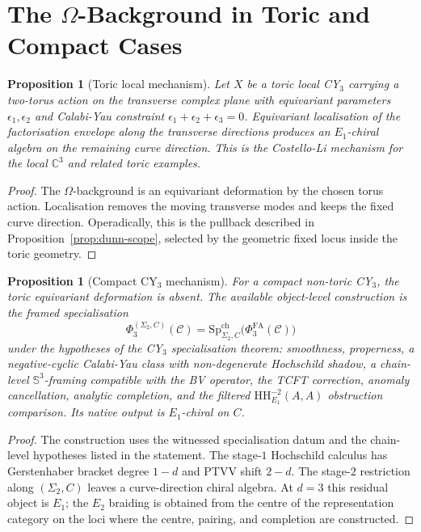 \documentclass[11pt]{amsart}
\newtheorem{proposition}[theorem]{Proposition}
\theoremstyle{definition}
\theoremstyle{remark}
\newcommand{\HH}{\mathrm{HH}}
\providecommand{\PhiFA}{\Phi^{\mathrm{FA}}}
\providecommand{\SpCh}{\mathrm{Sp}^{\mathrm{ch}}}
\newcommand{\cC}{\mathcal{C}}
\newcommand{\C}{\mathbb{C}}
\begin{document}
\section{The $\Omega$-Background in Toric and Compact Cases}
\label{sec:omega}

\begin{proposition}[Toric local mechanism]
\label{prop:omega-toric}
Let $X$ be a toric local CY$_3$ carrying a two-torus action on the
transverse complex plane with equivariant parameters
$\epsilon_1,\epsilon_2$ and Calabi-Yau constraint
$\epsilon_1+\epsilon_2+\epsilon_3=0$.  Equivariant localisation of the
factorisation envelope along the transverse directions produces an
$E_1$-chiral algebra on the remaining curve direction.  This is the
Costello-Li mechanism for the local $\C^3$ and related toric examples.
\end{proposition}

\begin{proof}
The $\Omega$-background is an equivariant deformation by the chosen
torus action.  Localisation removes the moving transverse modes and keeps
the fixed curve direction.  Operadically, this is the pullback described
in Proposition~\ref{prop:dunn-scope}, selected by the geometric fixed
locus inside the toric geometry.
\end{proof}

\begin{proposition}[Compact CY$_3$ mechanism]
\label{prop:compact-cy3-mechanism}
For a compact non-toric CY$_3$, the toric equivariant deformation is
absent.  The available object-level construction is the framed
specialisation
\[
  \Phi_3^{(\Sigma_2,C)}(\cC)
  =
  \SpCh_{\Sigma_2,C}\bigl(\PhiFA_3(\cC)\bigr)
\]
under the hypotheses of the CY$_3$ specialisation theorem: smoothness,
properness, a negative-cyclic Calabi-Yau class with non-degenerate
Hochschild shadow, a chain-level $\mathbb{S}^3$-framing compatible with
the BV operator, the TCFT correction, anomaly cancellation, analytic
completion, and the filtered $\HH^{-2}_{E_1}(A,A)$ obstruction
comparison.  Its native output is $E_1$-chiral on $C$.
\end{proposition}

\begin{proof}
The construction uses the witnessed specialisation datum and the
chain-level hypotheses listed in the statement.  The stage-$1$
Hochschild calculus
has Gerstenhaber bracket degree $1-d$ and PTVV shift $2-d$.  The
stage-$2$ restriction along $(\Sigma_2,C)$ leaves a curve-direction
chiral algebra.  At $d=3$ this residual object is $E_1$; the $E_2$
braiding is obtained from the centre of the representation category on
the loci where the centre, pairing, and completion are constructed.
\end{proof}
\end{document}
